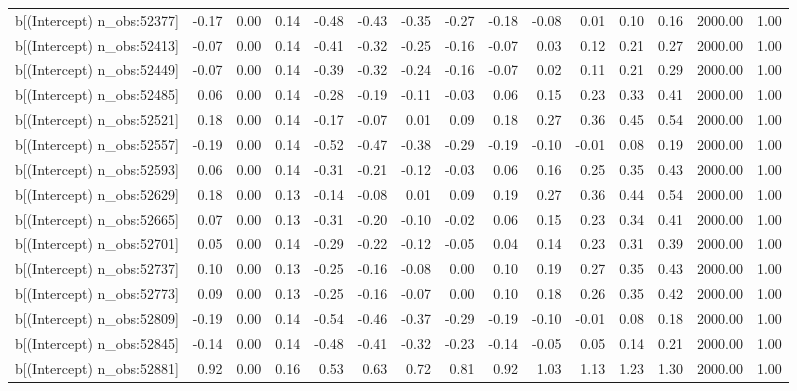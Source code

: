\begin{table}[ht]
\begin{tabular}{rrrrrrrrrrrrrrr}
  b[(Intercept) n\_obs:52377] & -0.17 & 0.00 & 0.14 & -0.48 & -0.43 & -0.35 & -0.27 & -0.18 & -0.08 & 0.01 & 0.10 & 0.16 & 2000.00 & 1.00 \\ 
  b[(Intercept) n\_obs:52413] & -0.07 & 0.00 & 0.14 & -0.41 & -0.32 & -0.25 & -0.16 & -0.07 & 0.03 & 0.12 & 0.21 & 0.27 & 2000.00 & 1.00 \\ 
  b[(Intercept) n\_obs:52449] & -0.07 & 0.00 & 0.14 & -0.39 & -0.32 & -0.24 & -0.16 & -0.07 & 0.02 & 0.11 & 0.21 & 0.29 & 2000.00 & 1.00 \\ 
  b[(Intercept) n\_obs:52485] & 0.06 & 0.00 & 0.14 & -0.28 & -0.19 & -0.11 & -0.03 & 0.06 & 0.15 & 0.23 & 0.33 & 0.41 & 2000.00 & 1.00 \\ 
  b[(Intercept) n\_obs:52521] & 0.18 & 0.00 & 0.14 & -0.17 & -0.07 & 0.01 & 0.09 & 0.18 & 0.27 & 0.36 & 0.45 & 0.54 & 2000.00 & 1.00 \\ 
  b[(Intercept) n\_obs:52557] & -0.19 & 0.00 & 0.14 & -0.52 & -0.47 & -0.38 & -0.29 & -0.19 & -0.10 & -0.01 & 0.08 & 0.19 & 2000.00 & 1.00 \\ 
  b[(Intercept) n\_obs:52593] & 0.06 & 0.00 & 0.14 & -0.31 & -0.21 & -0.12 & -0.03 & 0.06 & 0.16 & 0.25 & 0.35 & 0.43 & 2000.00 & 1.00 \\ 
  b[(Intercept) n\_obs:52629] & 0.18 & 0.00 & 0.13 & -0.14 & -0.08 & 0.01 & 0.09 & 0.19 & 0.27 & 0.36 & 0.44 & 0.54 & 2000.00 & 1.00 \\ 
  b[(Intercept) n\_obs:52665] & 0.07 & 0.00 & 0.13 & -0.31 & -0.20 & -0.10 & -0.02 & 0.06 & 0.15 & 0.23 & 0.34 & 0.41 & 2000.00 & 1.00 \\ 
  b[(Intercept) n\_obs:52701] & 0.05 & 0.00 & 0.14 & -0.29 & -0.22 & -0.12 & -0.05 & 0.04 & 0.14 & 0.23 & 0.31 & 0.39 & 2000.00 & 1.00 \\ 
  b[(Intercept) n\_obs:52737] & 0.10 & 0.00 & 0.13 & -0.25 & -0.16 & -0.08 & 0.00 & 0.10 & 0.19 & 0.27 & 0.35 & 0.43 & 2000.00 & 1.00 \\ 
  b[(Intercept) n\_obs:52773] & 0.09 & 0.00 & 0.13 & -0.25 & -0.16 & -0.07 & 0.00 & 0.10 & 0.18 & 0.26 & 0.35 & 0.42 & 2000.00 & 1.00 \\ 
  b[(Intercept) n\_obs:52809] & -0.19 & 0.00 & 0.14 & -0.54 & -0.46 & -0.37 & -0.29 & -0.19 & -0.10 & -0.01 & 0.08 & 0.18 & 2000.00 & 1.00 \\ 
  b[(Intercept) n\_obs:52845] & -0.14 & 0.00 & 0.14 & -0.48 & -0.41 & -0.32 & -0.23 & -0.14 & -0.05 & 0.05 & 0.14 & 0.21 & 2000.00 & 1.00 \\ 
  b[(Intercept) n\_obs:52881] & 0.92 & 0.00 & 0.16 & 0.53 & 0.63 & 0.72 & 0.81 & 0.92 & 1.03 & 1.13 & 1.23 & 1.30 & 2000.00 & 1.00 \\ 

\end{tabular}
\end{table}
